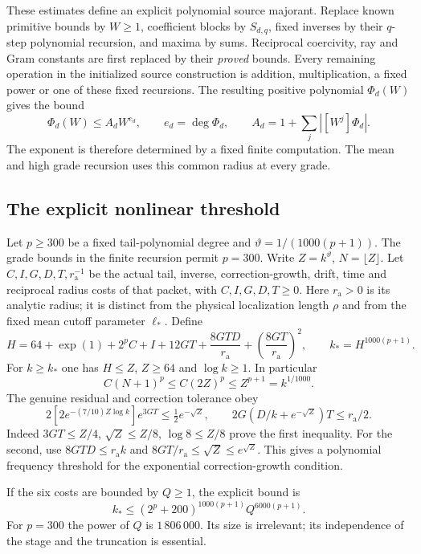 These estimates define an explicit polynomial source majorant. Replace
known primitive bounds by $W\geq1$, coefficient blocks by $S_{d,q}$,
fixed inverses by their $q$-step polynomial recursion, and maxima by
sums. Reciprocal coercivity, ray and Gram constants are first replaced
by their \emph{proved} bounds. Every remaining operation in the
initialized source construction is addition, multiplication, a fixed
power or one of these fixed recursions. The resulting positive
polynomial $\Phi_d(W)$ gives the bound
\[
 \Phi_d(W)\leq A_dW^{e_d},\qquad
 e_d=\deg\Phi_d,\qquad A_d=1+\sum_j|[W^j]\Phi_d|.
\]
The exponent is therefore determined by a fixed finite computation.
The mean and high grade recursion uses this common radius at every grade.

\subsection{The explicit nonlinear threshold}

Let $p\geq300$ be a fixed tail-polynomial degree and
$\vartheta=1/(1000(p+1))$. The grade bounds in the
finite recursion permit $p=300$. Write
$Z=k^\vartheta$, $N=\lfloor Z\rfloor$. Let $C,I,G,D,T,r_{\mathrm a}^{-1}$
be the actual tail, inverse, correction-growth, drift, time and reciprocal
radius costs of that packet, with $C,I,G,D,T\geq0$.
Here $r_{\mathrm a}>0$ is its analytic
radius; it is distinct from the physical localization length $\rho$ and
from the fixed mean cutoff parameter $\ell_*$. Define
\begin{equation}\label{eq:source-cap}
 H=64+\exp(1)+2^pC+I+12GT+\frac{8GTD}{r_{\mathrm a}}
                   +\left(\frac{8GT}{r_{\mathrm a}}\right)^2,\qquad
 k_*=H^{1000(p+1)}.
\end{equation}
For $k\geq k_*$ one has $H\leq Z$, $Z\geq64$ and $\log k\geq1$.
In particular
\[
 C(N+1)^p\leq C(2Z)^p\leq Z^{p+1}=k^{1/1000}.
\]
The genuine residual and correction tolerance obey
\[
 2[2e^{-(7/10)Z\log k}]e^{3GT}\leq\tfrac12e^{-\sqrt Z},
 \qquad
 2G(D/k+e^{-\sqrt Z})T\leq r_{\mathrm a}/2.
\]
Indeed $3GT\leq Z/4$, $\sqrt Z\leq Z/8$, $\log8\leq Z/8$ prove
the first inequality. For the second, use
$8GTD\leq r_{\mathrm a}k$ and
$8GT/r_{\mathrm a}\leq\sqrt Z\leq e^{\sqrt Z}$.
This gives a polynomial frequency threshold for the exponential
correction-growth condition.

If the six costs are bounded by $Q\geq1$, the explicit bound is
\begin{equation}\label{eq:polynomial-frequency-threshold}
 k_*\leq(2^p+200)^{1000(p+1)}Q^{6000(p+1)}.
\end{equation}
For $p=300$ the power of $Q$ is $1\,806\,000$. Its size is irrelevant;
its independence of the stage and the truncation is essential.

